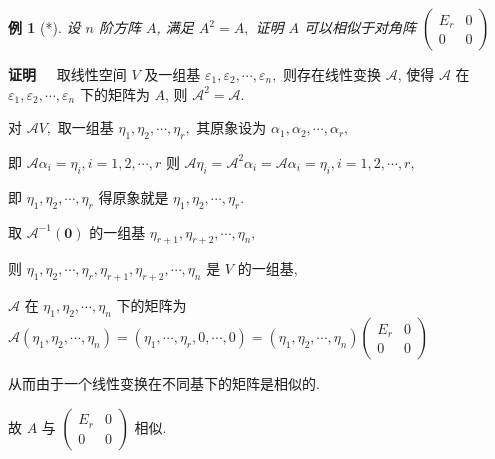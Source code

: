 \documentclass[13pt]{beamer}
\newtheorem{exa}{例}
\def\pf{{\bf 证明~~ }}
\def\A{\mathscr{A}}
\def\0{\mathbf{0}}
\begin{document}
\begin{frame}
\small{
\begin{exa}[*]
设 $n$ 阶方阵 $A$, 满足 $A^{2}=A,$ 证明 $A$ 可以相似于对角阵 $\left(\begin{array}{cc}E_{r} & 0 \\ 0 & 0\end{array}\right)$
\end{exa}

\pf 取线性空间 $V$ 及一组基 $\varepsilon_{1}, \varepsilon_{2}, \cdots, \varepsilon_{n},$ 则存在线性变换 $\A$,
使得 $\A$ 在 $\varepsilon_{1}, \varepsilon_{2}, \cdots, \varepsilon_{n}$ 下的矩阵为
$A$,
则 $\A^{2}=\A$.

 对 $\A V,$ 取一组基 $\eta_{1}, \eta_{2}, \cdots, \eta_{r},$ 其原象设为 $\alpha_{1}, \alpha_{2}, \cdots, \alpha_{r},$ 
 
即 $\A \alpha_{i}=\eta_{i}, i=1,2, \cdots, r$
则 $\A \eta_{i}=\A^{2} \alpha_{i}=\A \alpha_{i}=\eta_{i}, i=1,2, \cdots, r,$ 

即 $\eta_{1}, \eta_{2}, \cdots, \eta_{r}$ 得原象就是 $\eta_{1}, \eta_{2}, \cdots, \eta_{r} .$ 

取 $\A ^{-1}(\0)$ 的一组基
$\eta_{r+1}, \eta_{r+2}, \cdots, \eta_{n},$ 

则 $\eta_{1}, \eta_{2}, \cdots, \eta_{r}, \eta_{r+1}, \eta_{r+2}, \cdots, \eta_{n}$ 是 $V$ 的一组基, 

$\A$ 在 $\eta_{1}, \eta_{2}, \cdots, \eta_{n}$ 下的矩阵为
$\A\left(\eta_{1}, \eta_{2}, \cdots, \eta_{n}\right)=\left(\eta_{1}, \cdots, \eta_{r}, 0, \cdots, 0\right)=\left(\eta_{1}, \eta_{2}, \cdots, \eta_{n}\right)\left(\begin{array}{cc}E_{r} & 0 \\ 0 & 0\end{array}\right)$

从而由于一个线性变换在不同基下的矩阵是相似的.

故 $A$ 与 $\left(\begin{array}{cc}E_{r} & 0 \\ 0 & 0\end{array}\right)$ 相似.
}


\end{frame}
\end{document}
